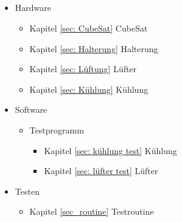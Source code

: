 \subsection{\nameSB}
\begin{itemize}
    \item Hardware
    \begin{itemize}
        \item Kapitel \ref{sec: CubeSat} CubeSat 
        \item Kapitel \ref{sec: Halterung} Halterung 
        \item Kapitel \ref{sec: Lüftung} Lüfter 
        \item Kapitel \ref{sec: Kühlung} Kühlung
    \end{itemize}
    \item Software
    \begin{itemize}
        \item Testprogramm
        \begin{itemize}
            \item Kapitel \ref{sec: kühlung test} Kühlung 
            \item Kapitel \ref{sec: lüfter test} Lüfter 
        \end{itemize}
    \end{itemize}
    \item Testen
    \begin{itemize}
    	\item Kapitel \ref{sec_routine} Testroutine
    \end{itemize}
\end{itemize}

